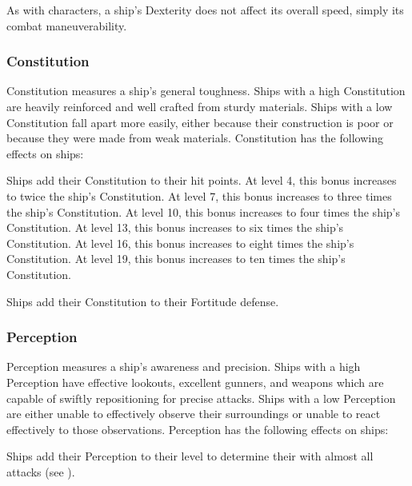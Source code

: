       As with characters, a ship's Dexterity does not affect its overall speed, simply its combat maneuverability.

    \subsubsection{Constitution}
      Constitution measures a ship's general toughness.
      Ships with a high Constitution are heavily reinforced and well crafted from sturdy materials.
      Ships with a low Constitution fall apart more easily, either because their construction is poor or because they were made from weak materials.
      Constitution has the following effects on ships:
      \begin{raggeditemize}
        \item Ships add their Constitution to their hit points.
          At level 4, this bonus increases to twice the ship's Constitution.
          At level 7, this bonus increases to three times the ship's Constitution.
          At level 10, this bonus increases to four times the ship's Constitution.
          At level 13, this bonus increases to six times the ship's Constitution.
          At level 16, this bonus increases to eight times the ship's Constitution.
          At level 19, this bonus increases to ten times the ship's Constitution.
        \item Ships add their Constitution to their Fortitude defense.
      \end{raggeditemize}

    \subsubsection{Perception}
      Perception measures a ship's awareness and precision.
      Ships with a high Perception have effective lookouts, excellent gunners, and weapons which are capable of swiftly repositioning for precise attacks.
      Ships with a low Perception are either unable to effectively observe their surroundings or unable to react effectively to those observations.
      Perception has the following effects on ships:
      \begin{raggeditemize}
        \item Ships add their Perception to their level to determine their  with almost all attacks (see ).
      \end{raggeditemize}

